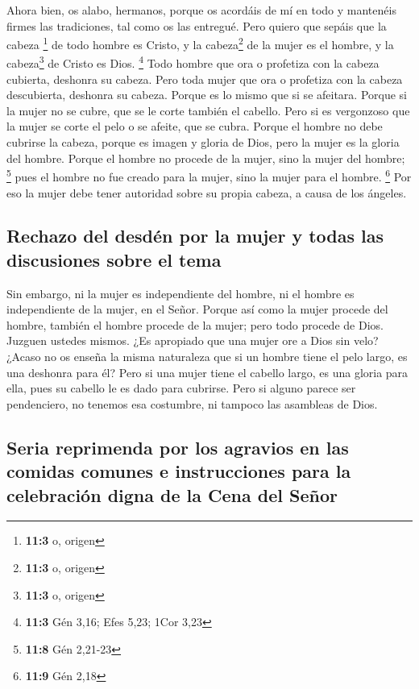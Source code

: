  Ahora bien, os alabo, hermanos, porque os acordáis de mí
en todo y mantenéis firmes las tradiciones, tal como os las entregué.
 Pero quiero que sepáis que la cabeza \footnote{\textbf{11:3}
  o, origen} de todo hombre es Cristo, y la cabeza\footnote{\textbf{11:3}
  o, origen} de la mujer es el hombre, y la cabeza\footnote{\textbf{11:3}
  o, origen} de Cristo es Dios. \footnote{\textbf{11:3} Gén 3,16; Efes
  5,23; 1Cor 3,23}  Todo hombre que ora o profetiza con la
cabeza cubierta, deshonra su cabeza.  Pero toda mujer que
ora o profetiza con la cabeza descubierta, deshonra su cabeza. Porque es
lo mismo que si se afeitara.  Porque si la mujer no se
cubre, que se le corte también el cabello. Pero si es vergonzoso que la
mujer se corte el pelo o se afeite, que se cubra.  Porque
el hombre no debe cubrirse la cabeza, porque es imagen y gloria de Dios,
pero la mujer es la gloria del hombre.  Porque el hombre
no procede de la mujer, sino la mujer del hombre; \footnote{\textbf{11:8}
  Gén 2,21-23}  pues el hombre no fue creado para la
mujer, sino la mujer para el hombre. \footnote{\textbf{11:9} Gén 2,18}
 Por eso la mujer debe tener autoridad sobre su propia
cabeza, a causa de los ángeles.

\hypertarget{rechazo-del-desduxe9n-por-la-mujer-y-todas-las-discusiones-sobre-el-tema}{%
\subsection{Rechazo del desdén por la mujer y todas las discusiones
sobre el
tema}\label{rechazo-del-desduxe9n-por-la-mujer-y-todas-las-discusiones-sobre-el-tema}}

 Sin embargo, ni la mujer es independiente del hombre, ni
el hombre es independiente de la mujer, en el Señor. 
Porque así como la mujer procede del hombre, también el hombre procede
de la mujer; pero todo procede de Dios.  Juzguen ustedes
mismos. ¿Es apropiado que una mujer ore a Dios sin velo? 
¿Acaso no os enseña la misma naturaleza que si un hombre tiene el pelo
largo, es una deshonra para él?  Pero si una mujer tiene
el cabello largo, es una gloria para ella, pues su cabello le es dado
para cubrirse.  Pero si alguno parece ser pendenciero, no
tenemos esa costumbre, ni tampoco las asambleas de Dios.

\hypertarget{seria-reprimenda-por-los-agravios-en-las-comidas-comunes-e-instrucciones-para-la-celebraciuxf3n-digna-de-la-cena-del-seuxf1or}{%
\subsection{Seria reprimenda por los agravios en las comidas comunes e
instrucciones para la celebración digna de la Cena del
Señor}\label{seria-reprimenda-por-los-agravios-en-las-comidas-comunes-e-instrucciones-para-la-celebraciuxf3n-digna-de-la-cena-del-seuxf1or}}

